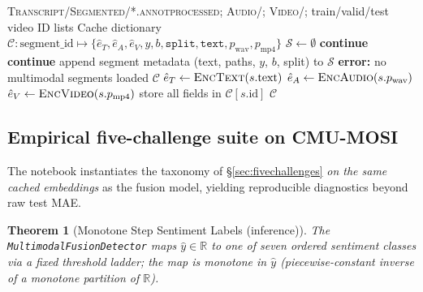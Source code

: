 \documentclass[12pt,a4paper]{article}
\theoremstyle{definition}
\theoremstyle{plain}
\newtheorem{theorem}{Theorem}[section]
\theoremstyle{remark}
\newcommand{\R}{\mathbb{R}}
\newcommand{\Sph}{\mathbb{S}}
\begin{document}
\begin{algorithm}[H]
\caption{Strict CMU-MOSI sample list and multimodal cache (Pipeline~E notebook)}
\label{alg:mosi_cache_strict}
\begin{algorithmic}[1]
\Require \textsc{Transcript/Segmented/*.annotprocessed}; \textsc{Audio/}; \textsc{Video/}; train/valid/test video ID lists
\Ensure Cache dictionary $\mathcal{C}: \text{segment\_id} \mapsto \{\hat{e}_T,\hat{e}_A,\hat{e}_V,y,b,\texttt{split},\texttt{text},p_{\text{wav}},p_{\text{mp4}}\}$
\State $\mathcal{S} \gets \emptyset$
   \textbf{continue} \EndIf
     \textbf{continue} \EndIf
    \State append segment metadata (text, paths, $y$, $b$, split) to $\mathcal{S}$
  \EndFor
\EndFor
{} \textbf{error:} no multimodal segments \EndIf
{} \State \Return loaded $\mathcal{C}$ \EndIf
{}
  \State $\hat{e}_T \gets \textsc{EncText}(s.\text{text})$ \Comment{BERT [CLS] $\to$ TextProj $\to \Sph^{511}$}
  \State $\hat{e}_A \gets \textsc{EncAudio}(s.p_{\text{wav}})$ 
  \State $\hat{e}_V \gets \textsc{EncVideo}(s.p_{\text{mp4}})$ 
  \State store all fields in $\mathcal{C}[s.\text{id}]$
\EndFor
\State \Return $\mathcal{C}$
\end{algorithmic}
\end{algorithm}

\subsection{Empirical five-challenge suite on CMU-MOSI}
\label{sec:pipelineE_challenges}

The notebook instantiates the taxonomy of \S\ref{sec:fivechallenges} \emph{on the same cached embeddings} as the fusion model, yielding reproducible diagnostics beyond raw test MAE.

\begin{theorem}[Monotone Step Sentiment Labels (inference)]
\label{thm:step_labels}
The \texttt{MultimodalFusionDetector} maps $\hat{y} \in \R$ to one of seven ordered sentiment classes via a fixed threshold ladder; the map is monotone in $\hat{y}$ (piecewise-constant inverse of a monotone partition of $\R$).
\end{theorem}
\end{document}
